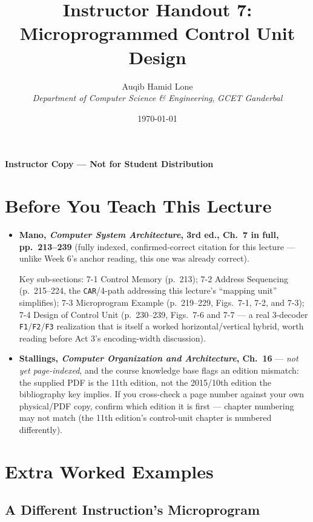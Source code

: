 \documentclass[11pt]{article}
\title{Instructor Handout 7: Microprogrammed Control Unit Design}
\author{Auqib Hamid Lone\\[0.3em]
  \emph{Department of Computer Science \& Engineering}, \emph{GCET Ganderbal}}
\date{\today}
\begin{document}
\maketitle
{\centering\large\color{negative}\textbf{Instructor Copy --- Not for Student Distribution}\par}
\vspace{0.5cm}

\section{Before You Teach This Lecture}

\begin{sloppypar}
\begin{itemize}
  \item \textbf{Mano, \textit{Computer System Architecture}, 3rd ed., Ch.~7 in full, pp.~213--239} (fully indexed, confirmed-correct citation for this lecture --- unlike Week 6's anchor reading, this one was already correct).

  Key sub-sections: 7-1 Control Memory (p.~213); 7-2 Address Sequencing (p.~215--224, the \texttt{CAR}\slash 4-path addressing this lecture's ``mapping unit'' simplifies); 7-3 Microprogram Example (p.~219--229, Figs.~7-1, 7-2, and 7-3); 7-4 Design of Control Unit (p.~230--239, Figs.~7-6 and 7-7 --- a real 3-decoder \texttt{F1}\slash\texttt{F2}\slash\texttt{F3} realization that is itself a worked horizontal/vertical hybrid, worth reading before Act 3's encoding-width discussion).
  \item \textbf{Stallings, \textit{Computer Organization and Architecture}, Ch.~16} --- \emph{not yet page-indexed}, and the course knowledge base flags an edition mismatch: the supplied PDF is the 11th edition, not the 2015/10th edition the bibliography key implies. If you cross-check a page number against your own physical/PDF copy, confirm which edition it is first --- chapter numbering may not match (the 11th edition's control-unit chapter is numbered differently).
\end{itemize}
\end{sloppypar}

\section{Extra Worked Examples}

\subsection{A Different Instruction's Microprogram}
\end{document}
